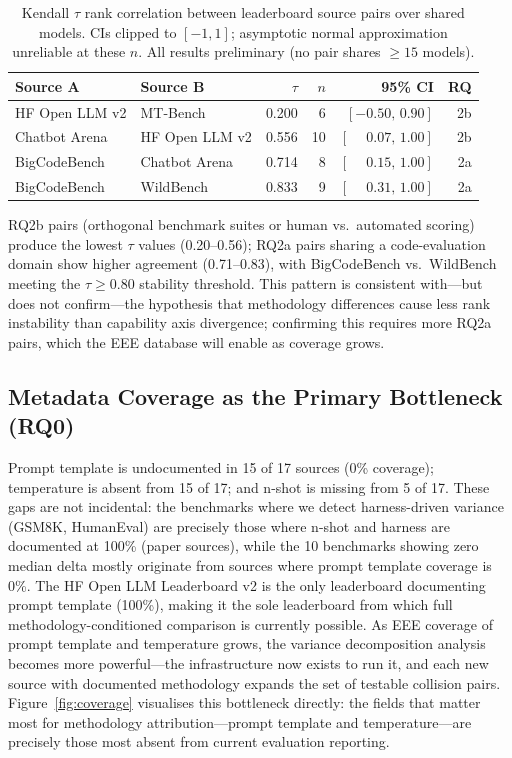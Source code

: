 \documentclass[11pt]{article}
\begin{document}
\begin{table}[t]
\centering
\small
\setlength{\tabcolsep}{3.5pt}
\caption{Kendall $\tau$ rank correlation between leaderboard source
pairs over shared models. CIs clipped to $[-1,1]$; asymptotic
normal approximation unreliable at these $n$. All results preliminary
(no pair shares $\geq 15$ models).}
\label{tab:ranks}
\begin{tabular}{llrrrr}
\toprule
\textbf{Source A} & \textbf{Source B} & $\tau$ &
  $n$ & \textbf{95\% CI} & \textbf{RQ} \\
\midrule
HF Open LLM v2  & MT-Bench      & 0.200 &  6 & $[-0.50,\, 0.90]$ & 2b \\
Chatbot Arena   & HF Open LLM v2 & 0.556 & 10 & $[\phantom{-}0.07,\, 1.00]$ & 2b \\
BigCodeBench    & Chatbot Arena  & 0.714 &  8 & $[\phantom{-}0.15,\, 1.00]$ & 2a \\
BigCodeBench    & WildBench      & 0.833 &  9 & $[\phantom{-}0.31,\, 1.00]$ & 2a \\
\bottomrule
\end{tabular}
\end{table}

RQ2b pairs (orthogonal benchmark suites or human vs.\ automated scoring)
produce the lowest $\tau$ values (0.20--0.56); RQ2a pairs sharing a
code-evaluation domain show higher agreement (0.71--0.83), with
BigCodeBench vs.\ WildBench meeting the $\tau \geq 0.80$ stability
threshold.
This pattern is consistent with---but does not confirm---the hypothesis
that methodology differences cause less rank instability than capability
axis divergence; confirming this requires more RQ2a pairs, which the
EEE database will enable as coverage grows.

\subsection{Metadata Coverage as the Primary Bottleneck (RQ0)}
\label{sec:coverage}

Prompt template is undocumented in 15 of 17 sources (0\% coverage);
temperature is absent from 15 of 17; and n-shot is missing from 5 of 17.
These gaps are not incidental: the benchmarks where we detect harness-driven
variance (GSM8K, HumanEval) are precisely those where n-shot and harness are
documented at 100\% (paper sources), while the 10 benchmarks showing zero
median delta mostly originate from sources where prompt template coverage is 0\%.
The HF Open LLM Leaderboard v2 is the only leaderboard documenting prompt
template (100\%), making it the sole leaderboard from which full
methodology-conditioned comparison is currently possible.
As EEE coverage of prompt template and temperature grows, the variance
decomposition analysis becomes more powerful---the infrastructure now exists
to run it, and each new source with documented methodology expands the set of
testable collision pairs.
Figure~\ref{fig:coverage} visualises this bottleneck directly: the fields
that matter most for methodology attribution---prompt template and
temperature---are precisely those most absent from current evaluation reporting.
\end{document}
